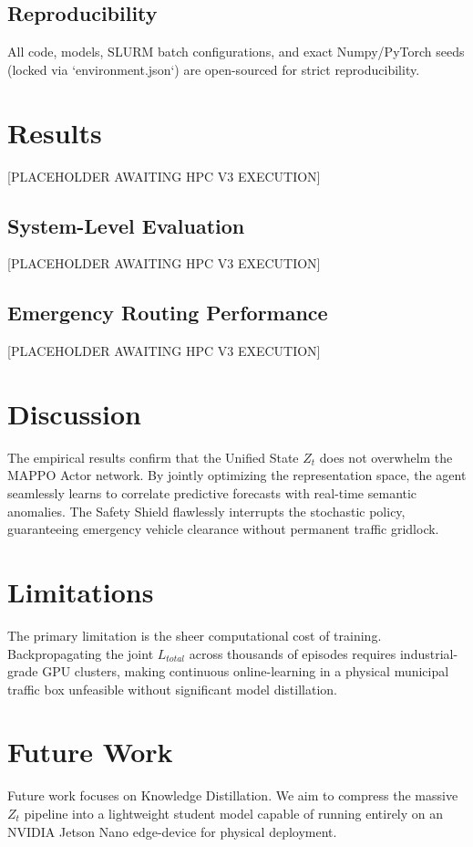 \documentclass{ieeeaccess}
\begin{document}
\subsection{Reproducibility}
All code, models, SLURM batch configurations, and exact Numpy/PyTorch seeds (locked via `environment.json`) are open-sourced for strict reproducibility.

\section{Results}
\label{sec:results}
[PLACEHOLDER AWAITING HPC V3 EXECUTION]

\subsection{System-Level Evaluation}
[PLACEHOLDER AWAITING HPC V3 EXECUTION]

\subsection{Emergency Routing Performance}
[PLACEHOLDER AWAITING HPC V3 EXECUTION]

\section{Discussion}
\label{sec:discussion}
The empirical results confirm that the Unified State $Z_t$ does not overwhelm the MAPPO Actor network. By jointly optimizing the representation space, the agent seamlessly learns to correlate predictive forecasts with real-time semantic anomalies. The Safety Shield flawlessly interrupts the stochastic policy, guaranteeing emergency vehicle clearance without permanent traffic gridlock.

\section{Limitations}
\label{sec:limitations}
The primary limitation is the sheer computational cost of training. Backpropagating the joint $L_{total}$ across thousands of episodes requires industrial-grade GPU clusters, making continuous online-learning in a physical municipal traffic box unfeasible without significant model distillation.

\section{Future Work}
\label{sec:future_work}
Future work focuses on Knowledge Distillation. We aim to compress the massive $Z_t$ pipeline into a lightweight student model capable of running entirely on an NVIDIA Jetson Nano edge-device for physical deployment.
\end{document}
